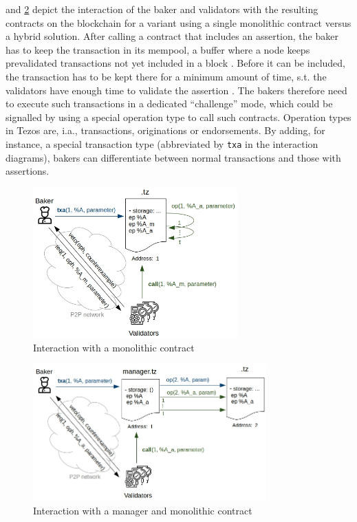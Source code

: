  and \ref{fig:interaction_monolithic_managertz} depict the interaction of the baker and validators with the resulting contracts on the blockchain for a variant using a single monolithic contract versus a hybrid solution. After calling a contract that includes an assertion, the baker has to keep the transaction in its mempool, a buffer where a node keeps prevalidated transactions not yet included in a block . Before it can be included, the transaction has to be kept there for a minimum amount of time, s.t. the validators have enough time to validate the assertion . The bakers therefore need to execute such transactions in a dedicated ``challenge'' mode, which could be signalled by using a special operation type to call such contracts. Operation types in Tezos are, i.a., transactions, originations or endorsements. By adding, for instance, a special transaction type (abbreviated by \texttt{txa} in the interaction diagrams), bakers can differentiate between normal transactions and those with assertions.
\begin{figure}[h]
\centering
  \includegraphics[width=0.7\textwidth]{figures/5-offline_tezos/interaction_monolithic.jpg}
	\caption{Interaction with a monolithic contract}
	\label{fig:interaction_monolithic}
\end{figure}

\begin{figure}[h]
\centering
  \includegraphics[width=0.8\textwidth]{figures/5-offline_tezos/interaction_monolithic_managertz.jpg}
	\caption{Interaction with a manager and monolithic contract}
	\label{fig:interaction_monolithic_managertz}
\end{figure}

